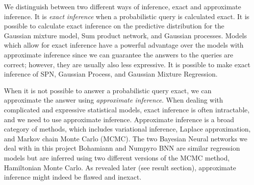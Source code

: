We distinguish between two different ways of inference, exact and approximate inference. It is
\textit{exact inference} when a probabilistic query is calculated exact. It is possible to
calculate exact inference on the predictive distribution for the Gaussian mixture model, Sum product
network, and Gaussian processes. Models which allow for exact inference have a powerful advantage
over the models with approximate inference since we can guarantee the answers to the queries are
correct; however, they are usually also less expressive. It is possible to make exact inference of
SPN, Gaussian Process, and Gaussian Mixture Regression. 

When it is not possible to answer a probabilistic query exact, we can approximate the answer using
\textit{approximate inference}. When dealing with complicated and expressive statistical models,
exact inference is often intractable, and we need to use approximate inference. Approximate inference
is a broad category of methods, which includes variational inference, Laplace approximation, and
Markov chain Monte Carlo (MCMC). The two Bayesian Neural networks we deal with in this project
Bohamiann and Numpyro BNN are similar regression models but are inferred using two different
versions of the MCMC method, Hamiltonian Monte Carlo. As revealed later (see result
section), approximate inference might indeed be flawed and inexact. 


